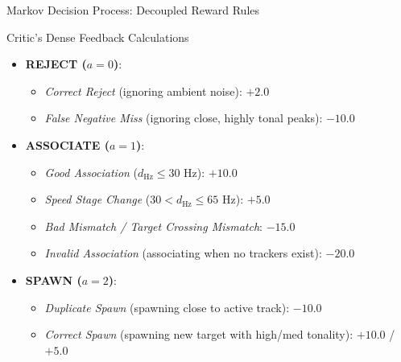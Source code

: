 \documentclass[10pt]{beamer}
\begin{document}
\begin{frame}{Markov Decision Process: Decoupled Reward Rules}
    \begin{block}{Critic's Dense Feedback Calculations}
        \begin{itemize}
            \item \textbf{REJECT ($a = 0$)}:
                \begin{itemize}
                    \item \textit{Correct Reject} (ignoring ambient noise): $+2.0$
                    \item \textit{False Negative Miss} (ignoring close, highly tonal peaks): $-10.0$
                \end{itemize}
            \item \textbf{ASSOCIATE ($a = 1$)}:
                \begin{itemize}
                    \item \textit{Good Association} ($d_{\text{Hz}} \le 30\text{ Hz}$): $+10.0$
                    \item \textit{Speed Stage Change} ($30 < d_{\text{Hz}} \le 65\text{ Hz}$): $+5.0$
                    \item \textit{Bad Mismatch / Target Crossing Mismatch}: $-15.0$
                    \item \textit{Invalid Association} (associating when no trackers exist): $-20.0$
                \end{itemize}
            \item \textbf{SPAWN ($a = 2$)}:
                \begin{itemize}
                    \item \textit{Duplicate Spawn} (spawning close to active track): $-10.0$
                    \item \textit{Correct Spawn} (spawning new target with high/med tonality): $+10.0$ / $+5.0$
                \end{itemize}
        \end{itemize}
    \end{block}
\end{frame}
\end{document}

